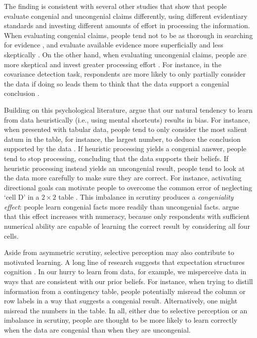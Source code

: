 \documentclass[12pt,letterpaper]{article}
\begin{document}
The finding is consistent with several other studies that show that people evaluate congenial and uncongenial claims differently, using different evidentiary standards and investing different amounts of effort in processing the information. When evaluating congenial claims, people tend not to be as thorough in searching for evidence \citep[e.g.,][]{kruglanksi1996, nickerson1998}, and evaluate available evidence more superficially and less skeptically \citep[e.g.,][]{chaiken1994}. On the other hand, when evaluating uncongenial claims, people are more skeptical and invest greater processing effort \citep[e.g.,][]{ditto1992, ditto1998, dawson2002}.  For instance, in the covariance detection task, respondents are more likely to only partially consider the data if doing so leads them to think that the data support a congenial conclusion \citep{dawson2002cella}. 

Building on this psychological literature, \citet{kahan2017} argue that our natural tendency to learn from data heuristically (i.e., using mental shortcuts) results in bias. For instance, when presented with tabular data, people tend to only consider the most salient datum in the table, for instance, the largest number, to deduce the conclusion supported by the data \citep[][p. 31]{gilovich1991}. If heuristic processing yields a congenial answer, people tend to stop processing, concluding that the data supports their beliefs. If heuristic processing instead yields an uncongenial result, people tend to look at the data more carefully to make sure they are correct. For instance, activating directional goals can motivate people to overcome the common error of neglecting `cell D' in a $2 \times 2$ table \citep{mata2015a, mata2015b}. This imbalance in scrutiny produces a {\it congeniality effect}: people learn congenial facts more readily than uncongenial facts. \citeauthor{kahan2017} argue that this effect increases with numeracy, because only respondents with sufficient numerical ability are capable of learning the correct result by considering all four cells.

Aside from asymmetric scrutiny, selective perception may also contribute to motivated learning. A long line of research suggests that expectation structures cognition \citep{hastorf1954, bechlivanidis2013, kahneman2013}. In our hurry to learn from data, for example, we misperceive data in ways that are consistent with our prior beliefs. For instance, when trying to distill information from a contingency table, people potentially misread the column or row labels in a way that suggests a congenial result. Alternatively, one might misread the numbers in the table. In all, either due to selective perception or an imbalance in scrutiny, people are thought to be more likely to learn correctly when the data are congenial than when they are uncongenial.
\end{document}
